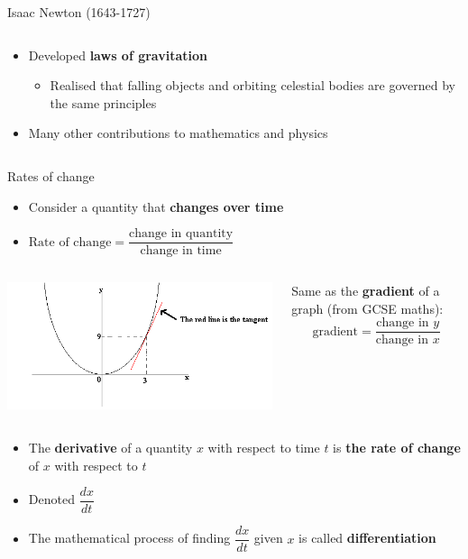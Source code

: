 \begin{frame}{Isaac Newton (1643-1727)}
\begin{columns}
\begin{column}{0.78\textwidth}
\begin{itemize}
\begin{itemize}
					\end{itemize}
				\pause\item Developed \textbf{laws of gravitation}
					\begin{itemize}
						\pause\item Realised that falling objects and orbiting celestial bodies are governed by the same principles
					\end{itemize}
				\pause\item Many other contributions to mathematics and physics
			\end{itemize}
		\end{column}
	\end{columns}
\end{frame}

\begin{frame}{Rates of change}
	\begin{itemize}
		\pause\item Consider a quantity that \textbf{changes over time}
		\pause\item $\text{Rate of change} = \dfrac{\text{change in quantity}}{\text{change in time}}$
	\end{itemize}
	\pause
	\begin{columns}
		\begin{column}{0.4\textwidth}
			\includegraphics[width=\textwidth]{gradient}
		\end{column}
		\begin{column}{0.58\textwidth}
			Same as the \textbf{gradient} of a graph (from GCSE maths):
			$$\text{gradient} = \dfrac{\text{change in } y}{\text{change in } x}$$
		\end{column}
	\end{columns}
	\begin{itemize}
		\pause\item The \textbf{derivative} of a quantity $x$ with respect to time $t$ is \textbf{the rate of change}
			of $x$ with respect to $t$
		\pause\item Denoted $\dfrac{dx}{dt}$
		\pause\item The mathematical process of finding $\dfrac{dx}{dt}$ given $x$ is called \textbf{differentiation}
	\end{itemize}
\end{frame}

